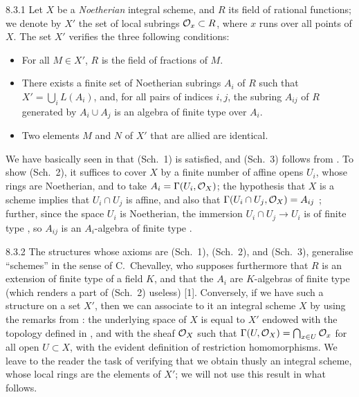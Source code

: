 
\begin{env}{8.3.1}
\label{env-1.8.3.1}
Let $X$ be a \emph{Noetherian} integral scheme, and $R$ its
field of rational functions; we denote by $X'$ the set of local subrings
$\mathcal{O}_x\subset R$, where $x$ runs over all points of $X$. The set $X'$ verifies
the three following conditions:
\begin{itemize}
  \item[(Sch. 1)] For all $M\in X'$, $R$ is the field of fractions of $M$.
  \item[(Sch. 2)] There exists a finite set of Noetherian subrings $A_i$ of $R$
  such that $X'=\bigcup_i L(A_i)$, and, for all pairs of indices $i,j$, the subring
  $A_{ij}$ of $R$ generated by $A_i\cup A_j$ is an algebra of finite type over $A_i$.
  \item[(Sch. 3)] Two elements $M$ and $N$ of $X'$ that are allied are identical.
\end{itemize}
\end{env}

We have basically seen in  that (Sch.~1) is satisfied, and (Sch.~3)
follows from . To show (Sch.~2), it suffices to cover $X$ by a
finite number of affine opens $U_i$, whose rings are Noetherian, and to take
$A_i=\Gamma(U_i,\mathcal{O}_X)$; the hypothesis that $X$ is a scheme implies that
$U_i\cap U_j$ is affine, and also that $\Gamma(U_i\cap U_j,\mathcal{O}_X)=A_{ij}$
; further, since the space $U_i$ is Noetherian, the immersion
$U_i\cap U_j\to U_i$ is of finite type , so $A_{ij}$ is an
$A_i$-algebra of finite type .

\begin{env}{8.3.2}
\label{env-1.8.3.2}
The structures whose axioms are (Sch.~1), (Sch.~2), and
(Sch.~3), generalise ``schemes'' in the sense of C.~Chevalley, who supposes
furthermore that $R$ is an extension of finite type of a field $K$, and that the
$A_i$ are $K$-algebras of finite type (which renders a part of (Sch.~2) useless)
[1]. Conversely, if we have such a structure on a set $X'$, then we can
associate to it an integral scheme $X$ by using the remarks from :
the underlying space of $X$ is equal to $X'$ endowed with the topology defined
in , and with the sheaf $\mathcal{O}_X$ such that
$\Gamma(U,\mathcal{O}_X)=\bigcap_{x\in U}\mathcal{O}_x$ for all open $U\subset X$, with the
evident definition of restriction homomorphisms. We leave to the reader the
task of verifying that we obtain thusly an integral scheme, whose local rings
are the elements of $X'$; we will not use this result in what follows.
\end{env}

